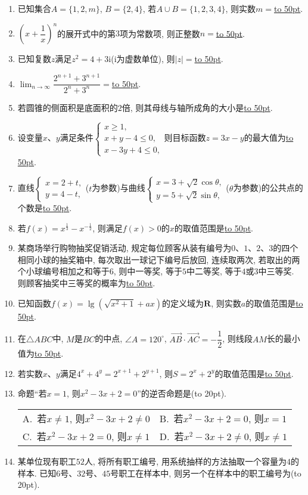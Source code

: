 \documentclass[10pt,a4paper]{article}
\newcommand{\blank}[1]{\underline{\hbox to #1pt{}}}
\newcommand{\bracket}[1]{(\hbox to #1pt{})}
\newcommand{\twoch}[4]{\par\begin{tabular}{p{.46\textwidth}p{.46\textwidth}}
A.~#1& B.~#2\\
C.~#3& D.~#4
\end{tabular}}
\begin{document}
\begin{enumerate}[1.]
\item 已知集合$A=\{1, 2, m\}$, $B=\{2, 4\}$, 若$A\cup B=\{1, 2, 3, 4\}$, 则实数$m=$\blank{50}.
\item $(x+\dfrac 1x)^n$的展开式中的第$3$项为常数项, 则正整数$n=$\blank{50}.
\item 已知复数$z$满足$z^2=4+3\mathrm{i}$($\mathrm{i}$为虚数单位), 则$|z|=$\blank{50}.
\item $\displaystyle\lim_{n\to \infty} \dfrac{2^{n+1}+3^{n+1}}{2^n+3^n}=$\blank{50}.
\item 若圆锥的侧面积是底面积的$2$倍, 则其母线与轴所成角的大小是\blank{50}.
\item 设变量$x$、$y$满足条件$\begin{cases} x\ge 1,\\ x+y-4\le 0,\\ x-3y+4\le 0,\end{cases}$则目标函数$z=3x-y$的最大值为\blank{50}.
\item 直线$\begin{cases} x=2+t,\\ y=4-t, \end{cases}$($t$为参数)与曲线$\begin{cases} x=3+\sqrt 2\cos \theta ,\\ y=5+\sqrt 2\sin \theta,  \end{cases}$($\theta$为参数)的公共点的个数是\blank{50}.
\item 若$f(x)=x^{\frac 13}-x^{-\frac 12}$, 则满足$f(x)>0$的$x$的取值范围是\blank{50}.
\item 某商场举行购物抽奖促销活动, 规定每位顾客从装有编号为$0$、$1$、$2$、$3$的四个相同小球的抽奖箱中, 每次取出一球记下编号后放回, 连续取两次, 若取出的两个小球编号相加之和等于$6$, 则中一等奖, 等于$5$中二等奖, 等于$4$或$3$中三等奖. 则顾客抽奖中三等奖的概率为\blank{50}.
\item 已知函数$f(x)=\lg (\sqrt {x^2+1}+ax)$的定义域为$\mathbf{R}$, 则实数$a$的取值范围是\blank{50}.
\item 在$\triangle ABC$中, $M$是$BC$的中点, $\angle A=120^\circ$, $\overrightarrow{AB}\cdot \overrightarrow{AC}=-\dfrac 12$, 则线段$AM$长的最小值为\blank{50}.
\item 若实数$x$、$y$满足$4^x+4^y=2^{x+1}+2^{y+1}$, 则$S=2^x+2^y$的取值范围是\blank{50}.
\item 命题``若$x=1$, 则$x^2-3x+2=0$''的逆否命题是\bracket{20}.
\twoch{若$x\ne 1$, 则$x^2-3x+2\ne 0$}{若$x^2-3x+2=0$, 则$x=1$}{若$x^2-3x+2=0$, 则$x\ne 1$}{若$x^2-3x+2\ne 0$, 则$x\ne 1$}
\item 某单位现有职工$52$人, 将所有职工编号, 用系统抽样的方法抽取一个容量为$4$的样本. 已知$6$号、$32$号、$45$号职工在样本中, 则另一个在样本中的职工编号为\bracket{20}.

\end{enumerate}
\end{document}
